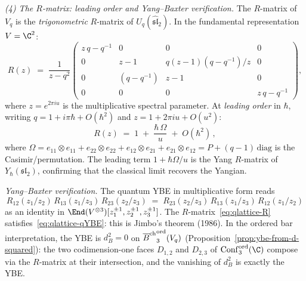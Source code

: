 \begin{conjecture}
\smallskip
\noindent
\emph{(4) The $R$-matrix: leading order and Yang--Baxter verification.}
The $R$-matrix of $V_q$ is the \emph{trigonometric}
$R$-matrix of $U_q(\widehat{\mathfrak{sl}}_2)$. In the
fundamental representation $V = \C^2$:
\begin{equation}\label{eq:qlattice-R}
R(z)
\;=\;
\frac{1}{z - q^2}
\begin{pmatrix}
z\,q - q^{-1} & 0 & 0 & 0 \\
0 & z - 1 & q(z-1)(q - q^{-1})/z & 0 \\
0 & (q - q^{-1}) & z - 1 & 0 \\
0 & 0 & 0 & z\,q - q^{-1}
\end{pmatrix},
\end{equation}
where $z = e^{2\pi i u}$ is the multiplicative spectral
parameter. At \emph{leading order} in $\hbar$, writing
$q = 1 + i\pi\hbar + O(\hbar^2)$ and $z = 1 + 2\pi iu
+ O(u^2)$:
\begin{equation}\label{eq:qlattice-R-leading}
R(z) \;=\; 1 \;+\; \frac{\hbar\,\Omega}{u} \;+\; O(\hbar^2)\,,
\end{equation}
where $\Omega = e_{11}\otimes e_{11} + e_{22}\otimes e_{22}
+ e_{12}\otimes e_{21} + e_{21}\otimes e_{12}
= P + (q{-}1)\,\mathrm{diag}$ is the Casimir/permutation.
The leading term $1 + \hbar\Omega/u$ is the Yang $R$-matrix
of $Y_\hbar(\mathfrak{sl}_2)$, confirming that the classical
limit recovers the Yangian.

\emph{Yang--Baxter verification.}
The quantum YBE in multiplicative form reads
\begin{equation}\label{eq:qlattice-qYBE}
R_{12}(z_1/z_2)\,R_{13}(z_1/z_3)\,R_{23}(z_2/z_3)
\;=\;
R_{23}(z_2/z_3)\,R_{13}(z_1/z_3)\,R_{12}(z_1/z_2)
\end{equation}
as an identity in $\End(V^{\otimes 3})[z_1^{\pm 1},
z_2^{\pm 1}, z_3^{\pm 1}]$. The $R$-matrix~\eqref{eq:qlattice-R}
satisfies~\eqref{eq:qlattice-qYBE}: this is Jimbo's theorem
(1986). In the ordered bar interpretation, the YBE is
$d_B^2 = 0$ on ${\overline{B}^{\mathrm{ch}}}^{\mathrm{ord}}_3(V_q)$
(Proposition~\ref{prop:ybe-from-d-squared}): the two
codimension-one faces $D_{1,2}$ and $D_{2,3}$ of
$\Conf_3^{\mathrm{ord}}(\C)$ compose via
the $R$-matrix at their intersection, and the vanishing
of $d_B^2$ is exactly the YBE.


\end{conjecture}

